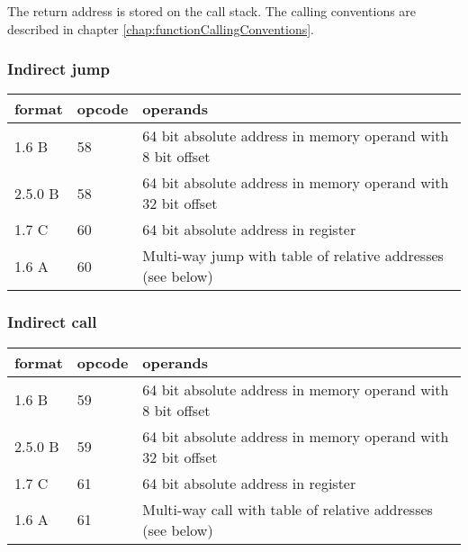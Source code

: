 \documentclass[forwardcom.tex]{subfiles}
\begin{document}
The return address is stored on the call stack. The calling conventions are described in chapter \ref{chap:functionCallingConventions}.


\subsubsection{Indirect jump}

\label{table:indirectJumpInstruction}
\begin{tabular}{|p{14mm}|p{12mm}|p{110mm}|}
\hline
\bfseries format & \bfseries opcode & \bfseries operands \\ \hline
1.6 B & 58 & 64 bit absolute address in memory operand with 8 bit offset \\ \hline
2.5.0 B & 58 & 64 bit absolute address in memory operand with 32 bit offset \\ \hline
1.7 C & 60 & 64 bit absolute address in register \\ \hline
1.6 A & 60 & Multi-way jump with table of relative addresses (see below) \\ \hline
\end{tabular}
\vspace{2mm}


\subsubsection{Indirect call}
\label{table:IndirectCallInstruction}
\begin{tabular}{|p{14mm}|p{12mm}|p{110mm}|}
\hline
\bfseries format & \bfseries opcode & \bfseries operands \\ \hline
1.6 B & 59 & 64 bit absolute address in memory operand with 8 bit offset \\ \hline
2.5.0 B & 59 & 64 bit absolute address in memory operand with 32 bit offset \\ \hline
1.7 C & 61 & 64 bit absolute address in register \\ \hline
1.6 A & 61 & Multi-way call with table of relative addresses (see below) \\ \hline\end{tabular}
\vspace{2mm}
\end{document}
